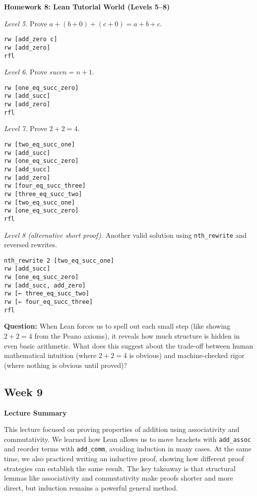\documentclass{article}
\theoremstyle{plain}
\theoremstyle{definition}
\theoremstyle{remark}
\begin{document}
\textbf{Homework 8: Lean Tutorial World (Levels 5--8)}

\textit{Level 5.} Prove $a + (b + 0) + (c + 0) = a + b + c$.

\begin{verbatim}
rw [add_zero c]
rw [add_zero]
rfl
\end{verbatim}

\textit{Level 6.} Prove $succ n = n + 1$.

\begin{verbatim}
rw [one_eq_succ_zero]
rw [add_succ]
rw [add_zero]
rfl
\end{verbatim}

\textit{Level 7.} Prove $2 + 2 = 4$.

\begin{verbatim}
rw [two_eq_succ_one]
rw [add_succ]
rw [one_eq_succ_zero]
rw [add_succ]
rw [add_zero]
rw [four_eq_succ_three]
rw [three_eq_succ_two]
rw [two_eq_succ_one]
rw [one_eq_succ_zero]
rfl
\end{verbatim}

\textit{Level 8 (alternative short proof).} Another valid solution using \texttt{nth\_rewrite} and reversed rewrites.

\begin{verbatim}
nth_rewrite 2 [two_eq_succ_one]
rw [add_succ]
rw [one_eq_succ_zero]
rw [add_succ, add_zero]
rw [← three_eq_succ_two]
rw [← four_eq_succ_three]
rfl
\end{verbatim}

\textbf{Question:} When Lean forces us to spell out each small step (like showing $2 + 2 = 4$ from the Peano axioms), it reveals how much structure is hidden in even basic arithmetic. What does this suggest about the trade-off between human mathematical intuition (where $2 + 2 = 4$ is obvious) and machine-checked rigor (where nothing is obvious until proved)?

\subsection{Week 9}
\textbf{Lecture Summary}

This lecture focused on proving properties of addition using associativity and commutativity. We learned how Lean allows us to move brackets with \texttt{add\_assoc} and reorder terms with \texttt{add\_comm}, avoiding induction in many cases. At the same time, we also practiced writing an inductive proof, showing how different proof strategies can establish the same result. The key takeaway is that structural lemmas like associativity and commutativity make proofs shorter and more direct, but induction remains a powerful general method.
\end{document}
